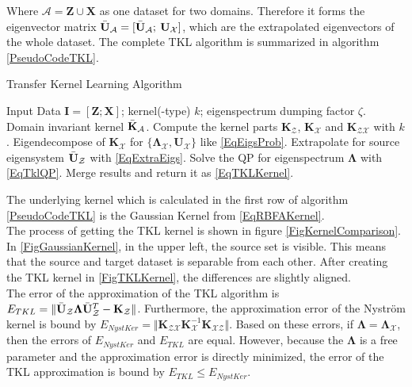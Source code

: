 Where $\mathcal{A}= \mathbf{Z} \cup \mathbf{X}$ as one dataset for two domains.
Therefore it forms the eigenvector matrix $ \bar{\mathbf{U}}_\mathcal{A} =[ \bar{\mathbf{U}}_\mathcal{A};\>  \mathbf{U}_\mathcal{X}]$, which are the extrapolated eigenvectors of the whole dataset.\newline
The complete \acs{TKL} algorithm is summarized in algorithm \ref{PseudoCodeTKL}.\cite{Long.2015}
\begin{algorithm}
	\caption{Transfer Kernel Learning Algorithm}\label{PseudoCodeTKL}	
	\begin{algorithmic}[1]
		\Require Input Data $\mathbf{I} = [\mathbf{Z};\mathbf{X}]$; kernel(-type) $k$; eigenspectrum dumping factor $\zeta$.
		\Ensure Domain invariant kernel $\bar{\mathbf{K}}_\mathcal{A}$.
		\State Compute the kernel parts $\mathbf{K}_\mathcal{Z}$, $\mathbf{K}_\mathcal{X}$ and $\mathbf{K}_\mathcal{ZX}$ with $k$.
		\State Eigendecompose of $\mathbf{K}_\mathcal{X}$ for $\{\mathbf{\Lambda}_\mathcal{X}, \mathbf{U}_\mathcal{X}\}$ like \eqref{EqEigsProb}.
		\State Extrapolate for source eigensystem  $\bar{\mathbf{U}}_\mathcal{Z}$ with \eqref{EqExtraEigs}.
		\State Solve the \acs{QP} for eigenspectrum $\mathbf{\Lambda}$ with \eqref{EqTklQP}.
		\State Merge results and return it as \eqref{EqTKLKernel}.
	\end{algorithmic}
\end{algorithm}
The underlying kernel which is calculated in the first row of algorithm \ref{PseudoCodeTKL} is the Gaussian Kernel from \eqref{EqRBFAKernel}.\\
The process of getting the \acs{TKL} kernel is shown in figure \ref{FigKernelComparison}. In \ref{FigGaussianKernel}, in the upper left, the source set is visible.
This means that the source and target dataset is separable from each other.
After creating the \acs{TKL} kernel in \ref{FigTKLKernel}, the differences are slightly aligned.\\
The error of the approximation of the \acl{TKL} algorithm is $E_{TKL} = \Vert \bar{\mathbf{U}}_\mathcal{Z} \boldsymbol{\Lambda}\bar{\mathbf{U}}_\mathcal{Z}^T - \mathbf{K}_\mathcal{Z}\Vert$.
Furthermore, the approximation error of the Nyström kernel is bound by $E_{NystKer} = \Vert \mathbf{K}_{\mathcal{ZX}} \mathbf{K}_{\mathcal{X}}^{-1}\mathbf{K}_{\mathcal{XZ}}\Vert$.
Based on these errors, if $\boldsymbol{\Lambda} = \boldsymbol{\Lambda}_\mathcal{X}$, then the errors of $E_{NystKer}$ and $E_{TKL}$ are equal. 
However, because the $\boldsymbol{\Lambda}$ is a free parameter and the approximation error is directly minimized, the error of the \acs{TKL} approximation is bound by $E_{TKL}\le E_{NystKer}$.\cite{Long.}\\
